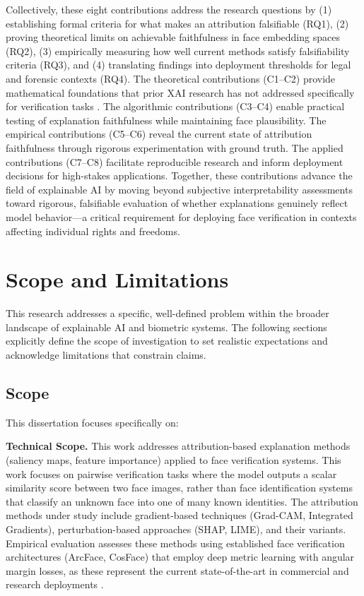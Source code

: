 Collectively, these eight contributions address the research questions by (1) establishing formal criteria for what makes an attribution falsifiable (RQ1), (2) proving theoretical limits on achievable faithfulness in face embedding spaces (RQ2), (3) empirically measuring how well current methods satisfy falsifiability criteria (RQ3), and (4) translating findings into deployment thresholds for legal and forensic contexts (RQ4). The theoretical contributions (C1--C2) provide mathematical foundations that prior XAI research has not addressed specifically for verification tasks \cite{Samek2021_XAI_Review}. The algorithmic contributions (C3--C4) enable practical testing of explanation faithfulness while maintaining face plausibility. The empirical contributions (C5--C6) reveal the current state of attribution faithfulness through rigorous experimentation with ground truth. The applied contributions (C7--C8) facilitate reproducible research and inform deployment decisions for high-stakes applications. Together, these contributions advance the field of explainable AI by moving beyond subjective interpretability assessments toward rigorous, falsifiable evaluation of whether explanations genuinely reflect model behavior---a critical requirement for deploying face verification in contexts affecting individual rights and freedoms.

\section{Scope and Limitations}
\label{sec:scope_limitations}

This research addresses a specific, well-defined problem within the broader landscape of explainable AI and biometric systems. The following sections explicitly define the scope of investigation to set realistic expectations and acknowledge limitations that constrain claims.

\subsection{Scope}

This dissertation focuses specifically on:

\textbf{Technical Scope.} This work addresses attribution-based explanation methods (saliency maps, feature importance) applied to face verification systems. This work focuses on pairwise verification tasks where the model outputs a scalar similarity score between two face images, rather than face identification systems that classify an unknown face into one of many known identities. The attribution methods under study include gradient-based techniques (Grad-CAM, Integrated Gradients), perturbation-based approaches (SHAP, LIME), and their variants. Empirical evaluation assesses these methods using established face verification architectures (ArcFace, CosFace) that employ deep metric learning with angular margin losses, as these represent the current state-of-the-art in commercial and research deployments \cite{deng2019arcface,wang2018cosface}.

